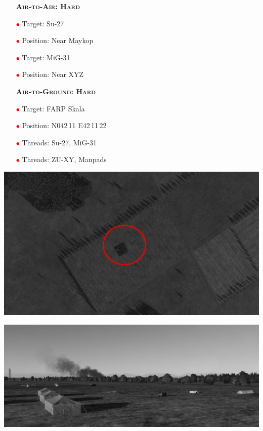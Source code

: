 \documentclass[a4paper,12pt,dvipsnames]{letter}
\newcommand{\myHead}[1]{{\LARGE\textsc{\textbf{#1}}}}
\newcommand{\ri}{\textcolor{Red}{$\bullet$\;}}
\begin{document}
{\begin{itemize}
 \item[] \myHead{Air-to-Air: Hard}
 \item[\ri] Target: Su-27
 \item[\ri] Position: Near Maykop
 \item[\ri] Target: MiG-31
 \item[\ri] Position: Near XYZ
\end{itemize}
%
\newpage
\begin{itemize}
 \item[] \myHead{Air-to-Ground: Hard}
 \item[\ri] Target: FARP Skala
 \item[\ri] Position: N042\,11 E42\,11\,22 
 \item[\ri] Threads: Su-27, MiG-31
 \item[\ri] Threads: ZU-XY, Manpads
\end{itemize}
\begin{center}
 \includegraphics[width=0.7\linewidth]{../gimp/FARP_Skala_Sat.png}
\end{center}
%
\begin{center}
 \includegraphics[width=0.7\linewidth]{../gimp/FARP_Skala_Pic.png}
\end{center}

}
\end{document}

